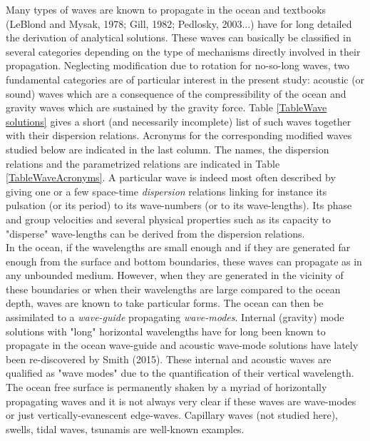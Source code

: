 \documentclass[a4paper,11pt]{article}
\begin{document}
Many types of waves are known to propagate in the ocean and textbooks (LeBlond and Mysak, 1978; Gill, 1982; Pedlosky, 2003...) have for long detailed the derivation of analytical solutions. These waves can basically be classified in several categories depending on the type of mechanisms directly involved in their propagation. Neglecting modification due to rotation for no-so-long waves, two fundamental categories are of particular interest in the present study: acoustic (or sound) waves which are a consequence of the compressibility of the ocean and gravity waves which are sustained by the gravity force. Table \ref{TableWave solutions} gives a short (and necessarily incomplete) list of such waves together with their dispersion relations. Acronyms for the corresponding modified waves studied below are indicated in the last column. The names, the dispersion relations and the parametrized relations are indicated in Table \ref{TableWaveAcronyms}. A particular wave is indeed most often described by giving one or a few space-time \textit{dispersion} relations linking for instance its pulsation (or its period) to its wave-numbers (or to its wave-lengths). Its phase and group velocities and several physical properties such as its capacity to "disperse" wave-lengths can be derived from the dispersion relations.\\
In the ocean, if the wavelengths are small enough and if they are generated far enough from the surface and bottom boundaries, these waves can propagate as in any unbounded medium. However, when they are generated in the vicinity of these boundaries or when their wavelengths are large compared to the ocean depth, waves are known to take particular forms. The ocean can then be assimilated to a \textit{wave-guide} propagating \textit{wave-modes}. Internal (gravity) mode solutions with "long" horizontal wavelengths have for long been known to propagate in the ocean wave-guide and acoustic wave-mode solutions have lately been re-discovered by Smith (2015). These internal and acoustic waves are qualified as "wave modes" due to the quantification of their vertical wavelength.\\
The ocean free surface is permanently shaken by a myriad of horizontally propagating waves and it is not always very clear if these waves are wave-modes or just vertically-evanescent edge-waves. Capillary waves (not studied here), swells, tidal waves, tsunamis are well-known examples.\\
\end{document}

